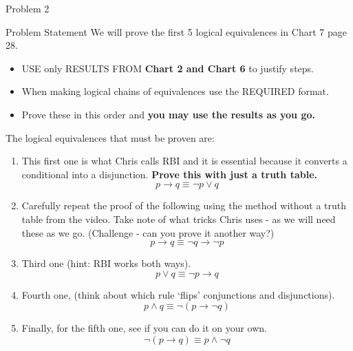 \begin{problem}{Problem 2}
    \begin{statement}{Problem Statement}
        We will prove the first 5 logical equivalences in Chart 7 page 28.
        \begin{itemize}
            \item USE only RESULTS FROM \textbf{Chart 2 and Chart 6} to justify steps.
            \item When making logical chains of equivalences use the REQUIRED format.
            \item Prove these in this order and \textbf{you may use the results as you go.}
        \end{itemize}

        The logical equivalences that must be proven are:
        \begin{enumerate}[label=(\alph*)]
            \item This first one is what Chris calls RBI and it is essential because it converts a conditional into a disjunction. \textbf{Prove this with just a truth table.}
            \begin{equation*}
                p \rightarrow q \equiv \neg p \vee q
            \end{equation*}
            \item Carefully repeat the proof of the following using the method without a truth table from the video. Take note of what tricks Chris uses - as we will need these as we go. (Challenge - can 
            you prove it another way?)
            \begin{equation*}
                p \rightarrow q \equiv \neg q \rightarrow \neg p
            \end{equation*}
            \item Third one (hint: RBI works both ways).
            \begin{equation*}
                p \vee q \equiv \neg p \rightarrow q
            \end{equation*}
            \item Fourth one, (think about which rule `flips' conjunctions and disjunctions).
            \begin{equation*}
                p \wedge q \equiv \neg(p \rightarrow \neg q)
            \end{equation*}
            \item Finally, for the fifth one, see if you can do it on your own.
            \begin{equation*}
                \neg(p \rightarrow q) \equiv p \wedge \neg q
            \end{equation*}
        \end{enumerate}
    \end{statement}


\end{problem}
